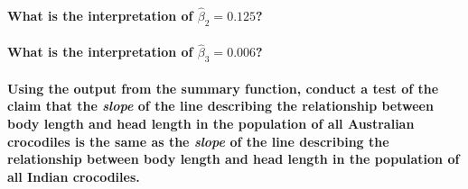 \documentclass[]{article}
\let\oldparagraph\paragraph
\renewcommand{\paragraph}[1]{\oldparagraph{#1}\mbox{}}
\begin{document}
\paragraph{\texorpdfstring{What is the interpretation of
\(\widehat{\beta}_2 = 0.125\)?}{What is the interpretation of \textbackslash{}widehat\{\textbackslash{}beta\}\_2 = 0.125?}}\label{what-is-the-interpretation-of-widehatbeta_2-0.125}

\vspace{2.5cm}

\paragraph{\texorpdfstring{What is the interpretation of
\(\widehat{\beta}_3 = 0.006\)?}{What is the interpretation of \textbackslash{}widehat\{\textbackslash{}beta\}\_3 = 0.006?}}\label{what-is-the-interpretation-of-widehatbeta_3-0.006}

\newpage

\paragraph{\texorpdfstring{Using the output from the summary function,
conduct a test of the claim that the \emph{slope} of the line describing
the relationship between body length and head length in the population
of all Australian crocodiles is the same as the \emph{slope} of the line
describing the relationship between body length and head length in the
population of all Indian
crocodiles.}{Using the output from the summary function, conduct a test of the claim that the slope of the line describing the relationship between body length and head length in the population of all Australian crocodiles is the same as the slope of the line describing the relationship between body length and head length in the population of all Indian crocodiles.}}\label{using-the-output-from-the-summary-function-conduct-a-test-of-the-claim-that-the-slope-of-the-line-describing-the-relationship-between-body-length-and-head-length-in-the-population-of-all-australian-crocodiles-is-the-same-as-the-slope-of-the-line-describing-the-relationship-between-body-length-and-head-length-in-the-population-of-all-indian-crocodiles.}
\end{document}
